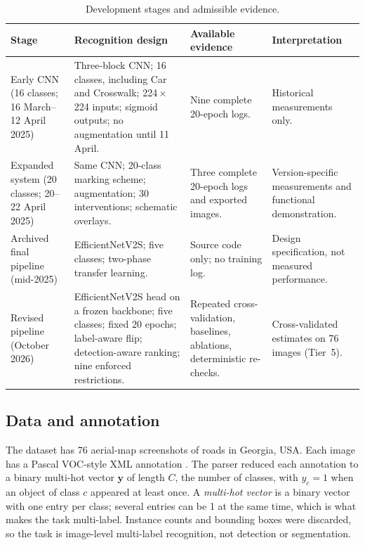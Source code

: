 \documentclass[11pt]{article}
\begin{document}
\begin{table}[!htbp]
\centering\small
\caption{Development stages and admissible evidence.}
\label{tab:stages}
\begin{tabularx}{\textwidth}{P{0.19\textwidth} P{0.30\textwidth} P{0.25\textwidth} Y}
\toprule
Stage & Recognition design & Available evidence & Interpretation \\
\midrule
Early CNN (16 classes; 16 March--12 April 2025) & Three-block CNN; 16 classes, including Car and Crosswalk; 224\,$\times$\,224 inputs; sigmoid outputs; no augmentation until 11 April. & Nine complete 20-epoch logs. & Historical measurements only. \\
Expanded system (20 classes; 20--22 April 2025) & Same CNN; 20-class marking scheme; augmentation; 30 interventions; schematic overlays. & Three complete 20-epoch logs and exported images. & Version-specific measurements and functional demonstration. \\
Archived final pipeline (mid-2025) & EfficientNetV2S; five classes; two-phase transfer learning. & Source code only; no training log. & Design specification, not measured performance. \\
Revised pipeline (October 2026) & EfficientNetV2S head on a frozen backbone; five classes; fixed 20 epochs; label-aware flip; detection-aware ranking; nine enforced restrictions. & Repeated cross-validation, baselines, ablations, deterministic re-checks. & Cross-validated estimates on 76 images (Tier~5). \\
\bottomrule
\end{tabularx}
\end{table}

\subsection{Data and annotation}
\label{sec:data}
The dataset has 76 aerial-map screenshots of roads in Georgia, USA. Each image has a Pascal VOC-style XML annotation \citep{everingham2010}. The parser reduced each annotation to a binary multi-hot vector $\mathbf{y}$ of length $C$, the number of classes, with $y_c=1$ when an object of class $c$ appeared at least once. A \emph{multi-hot vector} is a binary vector with one entry per class; several entries can be 1 at the same time, which is what makes the task multi-label. Instance counts and bounding boxes were discarded, so the task is image-level multi-label recognition, not detection or segmentation.
\end{document}
